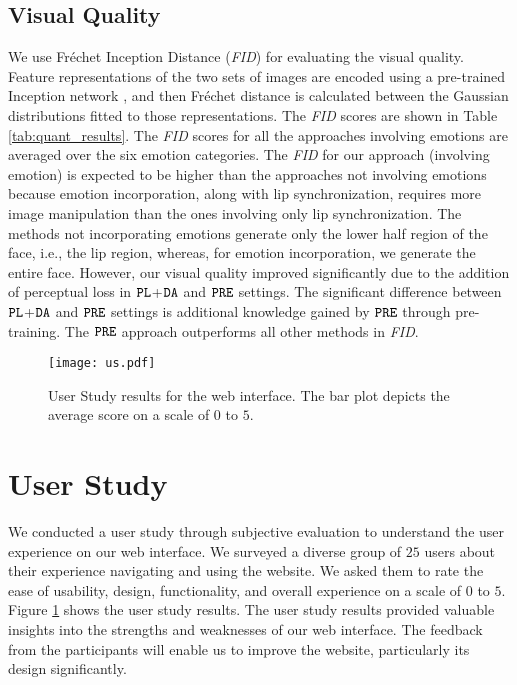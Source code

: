 \documentclass[accepted]{uai2023}
\begin{document}
\subsection{Visual Quality}
We use Fréchet Inception Distance (\emph{FID}) for evaluating the visual quality. Feature representations of the two sets of images are encoded using a pre-trained Inception network \citep{szegedy2015going}, and then Fréchet distance is calculated between the Gaussian distributions fitted to those representations. The \emph{FID} scores are shown in  Table \ref{tab:quant_results}. The \emph{FID} scores for all the approaches involving emotions are averaged over the six emotion categories. The \emph{FID} for our approach (involving emotion) is expected to be higher than the approaches not involving emotions \citep{prajwal2020lip, wang2021audio2head} because emotion incorporation, along with lip synchronization, requires more image manipulation than the ones involving only lip synchronization. The methods not incorporating emotions generate only the lower half region of the face, i.e., the lip region, whereas, for emotion incorporation, we generate the entire face. However, our visual quality improved significantly due to the addition of perceptual loss in ${\tt PL}$+${\tt DA}$ and ${\tt PRE}$ settings. The significant difference between ${\tt PL}$+${\tt DA}$ and ${\tt PRE}$ settings is additional knowledge gained by ${\tt PRE}$ through pre-training.
The ${\tt PRE}$ approach outperforms all other methods in \emph{FID}.

\begin{figure}[htp]
\texttt{[image: us.pdf]}
\caption{User Study results for the web interface. The bar
plot depicts the average score on a scale of $0$ to $5$.}
\label{fig:us_eval}
\end{figure}

\section{User Study}
We conducted a user study through subjective evaluation to understand the user experience on our web interface. We surveyed a diverse group of $25$ users about their experience navigating and using the website. We asked them to rate the ease of usability, design, functionality, and overall experience on a scale of $0$ to $5$. 
Figure \ref{fig:us_eval} shows the user study results. The user study results provided valuable insights into the strengths and weaknesses of our web interface.
The feedback from the participants will enable us to improve the website, particularly its design significantly. 
\end{document}
